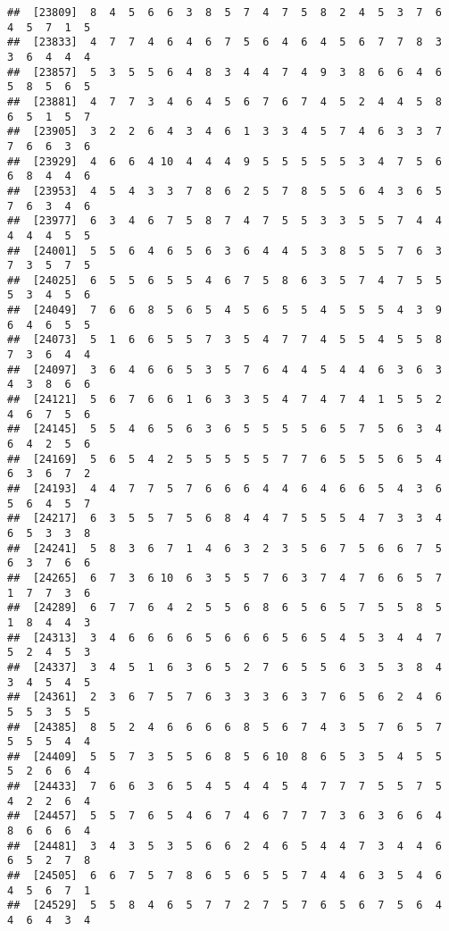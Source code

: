 \documentclass[
]{book}
\begin{document}
\begin{verbatim}
##  [23809]  8  4  5  6  6  3  8  5  7  4  7  5  8  2  4  5  3  7  6  4  5  7  1  5
##  [23833]  4  7  7  4  6  4  6  7  5  6  4  6  4  5  6  7  7  8  3  3  6  4  4  4
##  [23857]  5  3  5  5  6  4  8  3  4  4  7  4  9  3  8  6  6  4  6  5  8  5  6  5
##  [23881]  4  7  7  3  4  6  4  5  6  7  6  7  4  5  2  4  4  5  8  6  5  1  5  7
##  [23905]  3  2  2  6  4  3  4  6  1  3  3  4  5  7  4  6  3  3  7  7  6  6  3  6
##  [23929]  4  6  6  4 10  4  4  4  9  5  5  5  5  5  3  4  7  5  6  6  8  4  4  6
##  [23953]  4  5  4  3  3  7  8  6  2  5  7  8  5  5  6  4  3  6  5  7  6  3  4  6
##  [23977]  6  3  4  6  7  5  8  7  4  7  5  5  3  3  5  5  7  4  4  4  4  4  5  5
##  [24001]  5  5  6  4  6  5  6  3  6  4  4  5  3  8  5  5  7  6  3  7  3  5  7  5
##  [24025]  6  5  5  6  5  5  4  6  7  5  8  6  3  5  7  4  7  5  5  5  3  4  5  6
##  [24049]  7  6  6  8  5  6  5  4  5  6  5  5  4  5  5  5  4  3  9  6  4  6  5  5
##  [24073]  5  1  6  6  5  5  7  3  5  4  7  7  4  5  5  4  5  5  8  7  3  6  4  4
##  [24097]  3  6  4  6  6  5  3  5  7  6  4  4  5  4  4  6  3  6  3  4  3  8  6  6
##  [24121]  5  6  7  6  6  1  6  3  3  5  4  7  4  7  4  1  5  5  2  4  6  7  5  6
##  [24145]  5  5  4  6  5  6  3  6  5  5  5  5  6  5  7  5  6  3  4  6  4  2  5  6
##  [24169]  5  6  5  4  2  5  5  5  5  5  7  7  6  5  5  5  6  5  4  6  3  6  7  2
##  [24193]  4  4  7  7  5  7  6  6  6  4  4  6  4  6  6  5  4  3  6  5  6  4  5  7
##  [24217]  6  3  5  5  7  5  6  8  4  4  7  5  5  5  4  7  3  3  4  6  5  3  3  8
##  [24241]  5  8  3  6  7  1  4  6  3  2  3  5  6  7  5  6  6  7  5  6  3  7  6  6
##  [24265]  6  7  3  6 10  6  3  5  5  7  6  3  7  4  7  6  6  5  7  1  7  7  3  6
##  [24289]  6  7  7  6  4  2  5  5  6  8  6  5  6  5  7  5  5  8  5  1  8  4  4  3
##  [24313]  3  4  6  6  6  6  5  6  6  6  5  6  5  4  5  3  4  4  7  5  2  4  5  3
##  [24337]  3  4  5  1  6  3  6  5  2  7  6  5  5  6  3  5  3  8  4  3  4  5  4  5
##  [24361]  2  3  6  7  5  7  6  3  3  3  6  3  7  6  5  6  2  4  6  5  5  3  5  5
##  [24385]  8  5  2  4  6  6  6  6  8  5  6  7  4  3  5  7  6  5  7  5  5  5  4  4
##  [24409]  5  5  7  3  5  5  6  8  5  6 10  8  6  5  3  5  4  5  5  5  2  6  6  4
##  [24433]  7  6  6  3  6  5  4  5  4  4  5  4  7  7  7  5  5  7  5  4  2  2  6  4
##  [24457]  5  5  7  6  5  4  6  7  4  6  7  7  7  3  6  3  6  6  4  8  6  6  6  4
##  [24481]  3  4  3  5  3  5  6  6  2  4  6  5  4  4  7  3  4  4  6  6  5  2  7  8
##  [24505]  6  6  7  5  7  8  6  5  6  5  5  7  4  4  6  3  5  4  6  4  5  6  7  1
##  [24529]  5  5  8  4  6  5  7  7  2  7  5  7  6  5  6  7  5  6  4  4  6  4  3  4

\end{verbatim}
\end{document}
